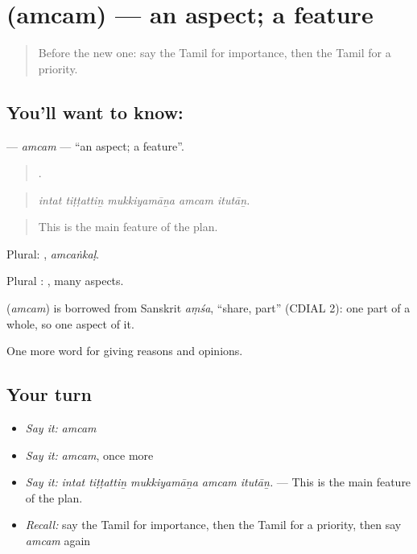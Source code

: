 \section[\texorpdfstring{\ta{அம்சம்} (amcam)}{அம்சம் (amcam)}]{ (amcam) — an aspect; a feature}

\label{lesson:TA-C354-amcam}



\begin{quote}
Before the new one: say the Tamil for importance, then the Tamil for a priority.
\end{quote}

\subsection*{You'll want to know: }
\textbf{} — \emph{amcam} — \textquotedblleft{}an aspect; a feature\textquotedblright{}.

\begin{quote}
    .
\end{quote}

\begin{quote}
\emph{intat tiṭṭattiṉ mukkiyamāṉa amcam itutāṉ.}
\end{quote}

\begin{quote}
This is the main feature of the plan.
\end{quote}

Plural: , \emph{amcaṅkaḷ}.

Plural :  , many aspects.

\begin{cousinweb}
\textbf{} (\emph{amcam}) is borrowed from Sanskrit \emph{aṃśa}, \textquotedblleft{}share, part\textquotedblright{} (CDIAL 2): one part of a whole, so one aspect of it.
\end{cousinweb}

\begin{grammarlens}[title={What you've built}]
One more word for giving reasons and opinions.
\end{grammarlens}

\subsection*{Your turn}
\begin{itemize}
\raggedright
  \item \emph{Say it:} \emph{amcam}
  \item \emph{Say it:} \emph{amcam}, once more
  \item \emph{Say it:} \emph{intat tiṭṭattiṉ mukkiyamāṉa amcam itutāṉ.} — This is the main feature of the plan.
  \item \emph{Recall:} say the Tamil for importance, then the Tamil for a priority, then say \emph{amcam} again
\end{itemize}

